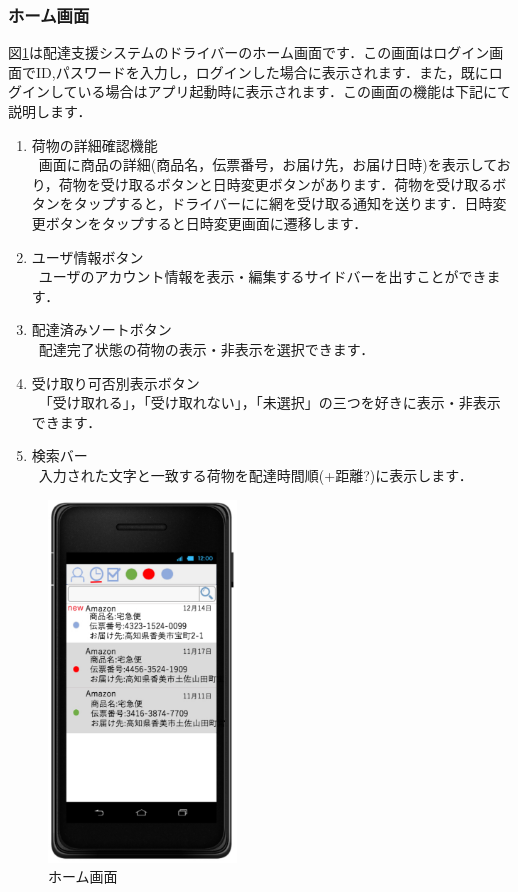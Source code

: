\documentclass[a4j,titlepage]{jarticle}
\begin{document}
\subsubsection{ホーム画面}
図\ref{fig:user_home}は配達支援システムのドライバーのホーム画面です．この画面はログイン画面でID,パスワードを入力し，ログインした場合に表示されます．また，既にログインしている場合はアプリ起動時に表示されます．この画面の機能は下記にて説明します．
\begin{enumerate}
	\item 荷物の詳細確認機能\\
	 \ 画面に商品の詳細(商品名，伝票番号，お届け先，お届け日時)を表示しており，荷物を受け取るボタンと日時変更ボタンがあります．荷物を受け取るボタンをタップすると，ドライバーにに網を受け取る通知を送ります．日時変更ボタンをタップすると日時変更画面に遷移します．
	\item ユーザ情報ボタン\\
	 \ ユーザのアカウント情報を表示・編集するサイドバーを出すことができます．

	\item 配達済みソートボタン\\
   \ 配達完了状態の荷物の表示・非表示を選択できます．

	\item 受け取り可否別表示ボタン\\
	 \ 「受け取れる」，「受け取れない」，「未選択」の三つを好きに表示・非表示できます．

	\item 検索バー\\
	 \ 入力された文字と一致する荷物を配達時間順(+距離?)に表示します．

\end{enumerate}

\begin{figure}[htbp]
 \begin{center}
  \includegraphics[width=50mm]{user_home.pdf}
	\caption{ホーム画面}
	\label{fig:user_home}
 \end{center}

\end{figure}
\end{document}
